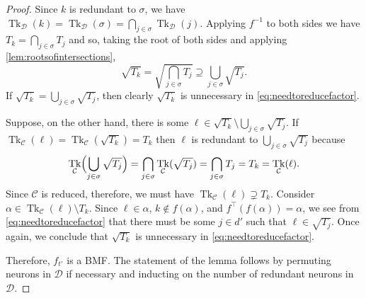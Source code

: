 \documentclass[10pt,a4paper]{amsart}
\def\cC{\mathcal{C}}
\def\cD{\mathcal{D}}
\DeclareMathOperator{\tk}{Tk}
\begin{document}
\begin{proof}
            Since $k$ is redundant to $\sigma$, we have $\tk_\cD(k) = \tk_\cD(\sigma) = \bigcap_{j\in\sigma} \tk_\cD(j)$.
            Applying $f^{-1}$ to both sides we have $T_k = \bigcap_{j\in\sigma} T_j$ and so, taking the root of both sides and applying \cref{lem:rootsofintersections},
            \[ \sqrt{T_k} = \sqrt{\bigcap_{j\in\sigma} T_j} \supseteq \bigcup_{j\in\sigma} \sqrt{T_j}. \]
            If $\sqrt{T_k} = \bigcup_{j\in\sigma} \sqrt{T_j}$, then clearly $\sqrt{T_k}$ is unnecessary in \eqref{eq:needtoreducefactor}.

            Suppose, on the other hand, there is some $\ell \in \sqrt{T_k} \setminus \bigcup_{j\in\sigma}\sqrt{T_j}$. If $\tk_\cC(\ell) = \tk_\cC(\sqrt{T_k}) =T_k$
            then $\ell$ is redundant to $\bigcup_{j\in\sigma} \sqrt{T_j}$
            because
                \[ \tk_\cC\Bigl(\bigcup_{j\in\sigma} \sqrt{T_j}\Bigr) = \bigcap_{j\in\sigma} \tk_\cC(\sqrt{T_j}) = \bigcap_{j\in\sigma} T_j = T_k = \tk_\cC(\ell). \]
            Since $\cC$ is reduced, therefore, we must have $\tk_\cC(\ell) \supsetneq T_k$.
            Consider $\alpha \in \tk_\cC(\ell) \setminus T_k$. Since $\ell \in \alpha$, $k \notin f(\alpha)$, and $f^\top(f(\alpha)) = \alpha$, we see from \eqref{eq:needtoreducefactor} that there must be some $j \in d'$ such that $\ell \in \sqrt{T_j}$. Once again, we conclude that $\sqrt{T_k}$ is unnecessary in \eqref{eq:needtoreducefactor}.

            Therefore, $f_{t'}$ is a BMF.
            The statement of the lemma follows by permuting neurons in $\cD$ if necessary and inducting on the number of redundant neurons in $\cD$.
        \end{proof}
\end{document}
